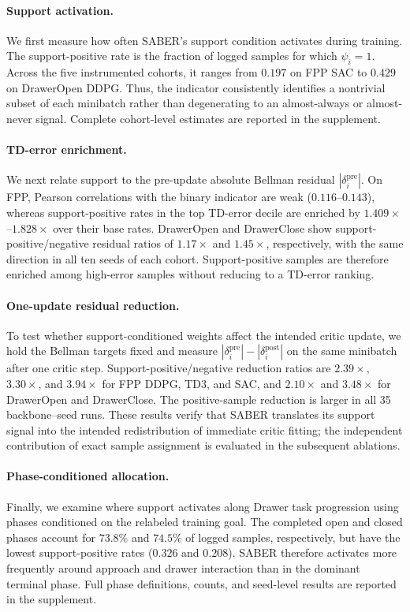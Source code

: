\documentclass[letterpaper]{article}
\begin{document}
\paragraph{Support activation.}
We first measure how often SABER's support condition activates during training. The support-positive rate is the fraction of logged samples for which \(\psi_i=1\). Across the five instrumented cohorts, it ranges from \(0.197\) on FPP SAC to \(0.429\) on DrawerOpen DDPG. Thus, the indicator consistently identifies a nontrivial subset of each minibatch rather than degenerating to an almost-always or almost-never signal. Complete cohort-level estimates are reported in the supplement.

\paragraph{TD-error enrichment.}
We next relate support to the pre-update absolute Bellman residual \(|\delta_i^{\mathrm{pre}}|\). On FPP, Pearson correlations with the binary indicator are weak (\(0.116\)--\(0.143\)), whereas support-positive rates in the top TD-error decile are enriched by \(1.409\times\)--\(1.828\times\) over their base rates. DrawerOpen and DrawerClose show support-positive/negative residual ratios of \(1.17\times\) and \(1.45\times\), respectively, with the same direction in all ten seeds of each cohort. Support-positive samples are therefore enriched among high-error samples without reducing to a TD-error ranking.

\paragraph{One-update residual reduction.}
To test whether support-conditioned weights affect the intended critic update, we hold the Bellman targets fixed and measure \(|\delta_i^{\mathrm{pre}}|-|\delta_i^{\mathrm{post}}|\) on the same minibatch after one critic step. Support-positive/negative reduction ratios are \(2.39\times\), \(3.30\times\), and \(3.94\times\) for FPP DDPG, TD3, and SAC, and \(2.10\times\) and \(3.48\times\) for DrawerOpen and DrawerClose. The positive-sample reduction is larger in all 35 backbone--seed runs. These results verify that SABER translates its support signal into the intended redistribution of immediate critic fitting; the independent contribution of exact sample assignment is evaluated in the subsequent ablations.


\paragraph{Phase-conditioned allocation.}
Finally, we examine where support activates along Drawer task progression using phases conditioned on the relabeled training goal. The completed open and closed phases account for \(73.8\%\) and \(74.5\%\) of logged samples, respectively, but have the lowest support-positive rates (\(0.326\) and \(0.208\)). SABER therefore activates more frequently around approach and drawer interaction than in the dominant terminal phase. Full phase definitions, counts, and seed-level results are reported in the supplement.
\end{document}
